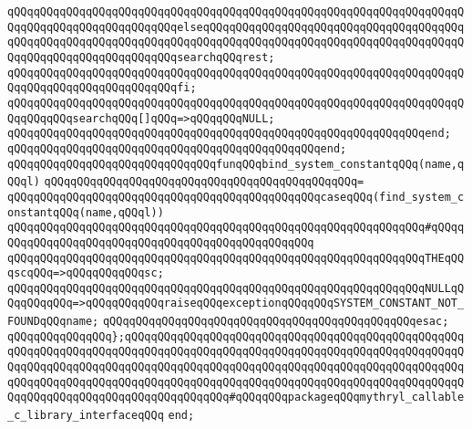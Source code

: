 \verb|qQQqqQQqqQQqqQQqqQQqqQQqqQQqqQQqqQQqqQQqqQQqqQQqqQQqqQQqqQQqqQQqqQQqqQQqqQQqqQQqqQQqqQQqqQQqqQQqelseqQQqqQQqqQQqqQQqqQQqqQQqqQQqqQQqqQQqqQQqqQQqqQQqqQQqqQQqqQQqqQQqqQQqqQQqqQQqqQQqqQQqqQQqqQQqqQQqqQQqqQQqqQQqqQQqqQQqqQQqqQQqqQQqqQQqqQQqsearchqQQqrest;|\newline
\verb|qQQqqQQqqQQqqQQqqQQqqQQqqQQqqQQqqQQqqQQqqQQqqQQqqQQqqQQqqQQqqQQqqQQqqQQqqQQqqQQqqQQqqQQqqQQqqQQqfi;|\newline
\newline
\verb|qQQqqQQqqQQqqQQqqQQqqQQqqQQqqQQqqQQqqQQqqQQqqQQqqQQqqQQqqQQqqQQqqQQqqQQqqQQqqQQqsearchqQQq[]qQQq=>qQQqqQQqNULL;|\newline
\verb|qQQqqQQqqQQqqQQqqQQqqQQqqQQqqQQqqQQqqQQqqQQqqQQqqQQqqQQqqQQqqQQqend;|\newline
\verb|qQQqqQQqqQQqqQQqqQQqqQQqqQQqqQQqqQQqqQQqqQQqqQQqend;|\newline
\newline
\verb|qQQqqQQqqQQqqQQqqQQqqQQqqQQqqQQqfunqQQqbind_system_constantqQQq(name,qQQql)|\newline
\verb|qQQqqQQqqQQqqQQqqQQqqQQqqQQqqQQqqQQqqQQqqQQqqQQq=|\newline
\verb|qQQqqQQqqQQqqQQqqQQqqQQqqQQqqQQqqQQqqQQqqQQqqQQqcaseqQQq(find_system_constantqQQq(name,qQQql))|\newline
\verb|qQQqqQQqqQQqqQQqqQQqqQQqqQQqqQQqqQQqqQQqqQQqqQQqqQQqqQQqqQQqqQQq#qQQqqQQqqQQqqQQqqQQqqQQqqQQqqQQqqQQqqQQqqQQqqQQqqQQq|\newline
\verb|qQQqqQQqqQQqqQQqqQQqqQQqqQQqqQQqqQQqqQQqqQQqqQQqqQQqqQQqqQQqqQQqTHEqQQqscqQQq=>qQQqqQQqqQQqsc;|\newline
\verb|qQQqqQQqqQQqqQQqqQQqqQQqqQQqqQQqqQQqqQQqqQQqqQQqqQQqqQQqqQQqqQQqNULLqQQqqQQqqQQq=>qQQqqQQqqQQqraiseqQQqexceptionqQQqqQQqSYSTEM_CONSTANT_NOT_FOUNDqQQqname;|\newline
\verb|qQQqqQQqqQQqqQQqqQQqqQQqqQQqqQQqqQQqqQQqqQQqqQQqesac;|\newline
\newline
\verb|qQQqqQQqqQQqqQQq};qQQqqQQqqQQqqQQqqQQqqQQqqQQqqQQqqQQqqQQqqQQqqQQqqQQqqQQqqQQqqQQqqQQqqQQqqQQqqQQqqQQqqQQqqQQqqQQqqQQqqQQqqQQqqQQqqQQqqQQqqQQqqQQqqQQqqQQqqQQqqQQqqQQqqQQqqQQqqQQqqQQqqQQqqQQqqQQqqQQqqQQqqQQqqQQqqQQqqQQqqQQqqQQqqQQqqQQqqQQqqQQqqQQqqQQqqQQqqQQqqQQqqQQqqQQqqQQqqQQqqQQqqQQqqQQqqQQqqQQqqQQqqQQqqQQqqQQq#qQQqqQQqpackageqQQqmythryl_callable_c_library_interfaceqQQq|\newline
\verb|end;|\newline
\newline
\newline
